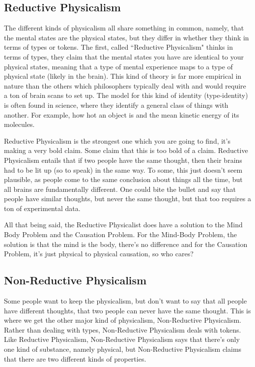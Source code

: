 \subsection{Reductive Physicalism}

The different kinds of physicalism all share something in common, namely, that the mental states are the physical states, but they differ in whether they think in terms of types or tokens. The first, called ``Reductive Physicalism" thinks in terms of types, they claim that the mental states you have are identical to your physical states, meaning that a type of mental experience maps to a type of physical state (likely in the brain). This kind of theory is far more empirical in nature than the others which philosophers typically deal with and would require a ton of brain scans to set up. The model for this kind of identity (type-identity) is often found in science, where they identify a general class of things with another. For example, how hot an object is and the mean kinetic energy of its molecules. 

Reductive Physicalism is the strongest one which you are going to find, it's making a very bold claim. Some claim that this is too bold of a claim. Reductive Physicalism entails that if two people have the same thought, then their brains had to be lit up (so to speak) in the same way. To some, this just doesn't seem plausible, as people come to the same conclusion about things all the time, but all brains are fundamentally different. One could bite the bullet and say that people have similar thoughts, but never the same thought, but that too requires a ton of experimental data. 

All that being said, the Reductive Physicalist does have a solution to the Mind Body Problem and the Causation Problem. For the Mind-Body Problem, the solution is that the mind is the body, there's no difference and for the Causation Problem, it's just physical to physical causation, so who cares? 

\subsection{Non-Reductive Physicalism}

Some people want to keep the physicalism, but don't want to say that all people have different thoughts, that two people can never have the same thought. This is where we get the other major kind of physicalism, Non-Reductive Physicalism. Rather than dealing with types, Non-Reductive Physicalism deals with tokens. Like Reductive Physicalism, Non-Reductive Physicalism says that there's only one kind of substance, namely physical, but Non-Reductive Physicalism claims that there are two different kinds of properties.

